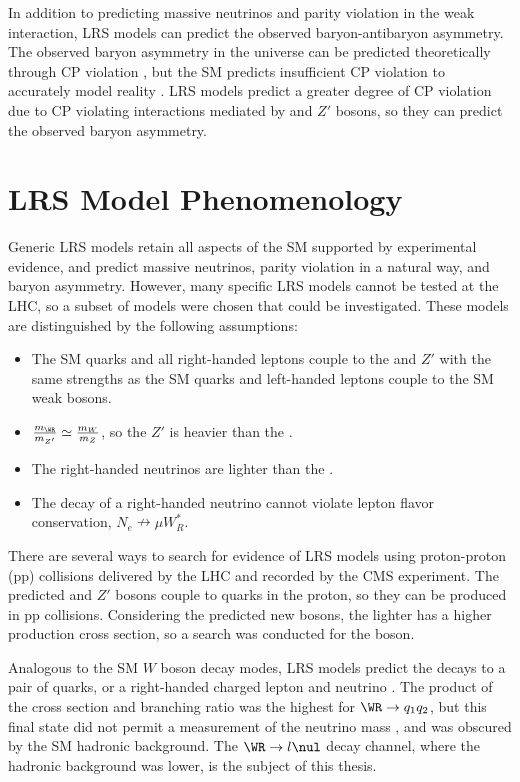 In addition to predicting massive neutrinos and parity violation in the weak interaction, LRS models can 
predict the observed baryon-antibaryon asymmetry.  The observed baryon asymmetry in the universe can be 
predicted theoretically through CP violation \cite{saharov}, but the SM predicts insufficient CP violation 
to accurately model reality \cite{surveyOfExtensions}.  LRS models predict a greater degree of CP violation 
due to CP violating interactions mediated by \WR and $Z'$ bosons, so they can predict the observed baryon 
asymmetry.


\section{LRS Model Phenomenology}
\label{sec:lrsPhenomenology}
Generic LRS models retain all aspects of the SM supported by experimental evidence, and predict massive 
neutrinos, parity violation in a natural way, and baryon asymmetry.  However, many specific LRS models 
cannot be tested at the LHC, so a subset of models were chosen that could be investigated.  These models 
are distinguished by the following assumptions:

\begin{itemize}
	\item The SM quarks and all right-handed leptons couple to the \WR and $Z'$ with the same strengths 
		as the SM quarks and left-handed leptons couple to the SM weak bosons.
	\item $\frac{m_{\WR}}{m_{Z'}} \simeq \frac{m_{W}}{m_{Z}}$, so the $Z'$ is heavier than the \WR.
	\item The right-handed neutrinos \nul are lighter than the \WR.
	\item The decay of a right-handed neutrino cannot violate lepton flavor conservation, $N_{e} \nrightarrow \mu W^{*}_{R}$.
\end{itemize}

There are several ways to search for evidence of LRS models using proton-proton (pp) collisions delivered 
by the LHC and recorded by the CMS experiment.  The predicted \WR and $Z'$ bosons couple to quarks in the 
proton, so they can be produced in pp collisions.  Considering the predicted new bosons, the lighter \WR 
has a higher production cross section, so a search was conducted for the \WR boson.

Analogous to the SM $W$ boson decay modes, LRS models predict the \WR decays to a pair of quarks, or a 
right-handed charged lepton and neutrino \nul.  The product of the cross section and branching ratio 
was the highest for $\WR \rightarrow q_{1}q_{2}$, but this final state did not permit a measurement of 
the neutrino mass \mnul, and was obscured by the SM hadronic background.  The $\WR \rightarrow l\nul$ 
decay channel, where the hadronic background was lower, is the subject of this thesis.


